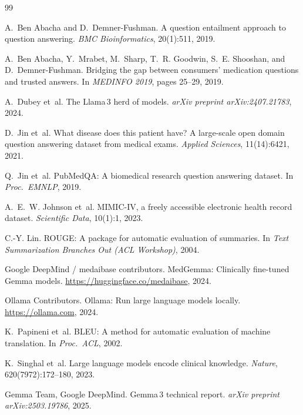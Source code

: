 \documentclass[11pt]{article}
\begin{document}
\begin{thebibliography}{99}

A.~Ben Abacha and D.~Demner-Fushman.
\newblock A question entailment approach to question answering.
\newblock \emph{BMC Bioinformatics}, 20(1):511, 2019.

A.~Ben Abacha, Y.~Mrabet, M.~Sharp, T.~R. Goodwin, S.~E. Shooshan, and
D.~Demner-Fushman.
\newblock Bridging the gap between consumers' medication questions and trusted
answers.
\newblock In \emph{MEDINFO 2019}, pages 25--29, 2019.

A.~Dubey et~al.
\newblock The Llama\,3 herd of models.
\newblock \emph{arXiv preprint arXiv:2407.21783}, 2024.

D.~Jin et~al.
\newblock What disease does this patient have? A large-scale open domain
question answering dataset from medical exams.
\newblock \emph{Applied Sciences}, 11(14):6421, 2021.

Q.~Jin et~al.
\newblock PubMedQA: A biomedical research question answering dataset.
\newblock In \emph{Proc.\ EMNLP}, 2019.

A.~E.~W. Johnson et~al.
\newblock MIMIC-IV, a freely accessible electronic health record dataset.
\newblock \emph{Scientific Data}, 10(1):1, 2023.

C.-Y. Lin.
\newblock ROUGE: A package for automatic evaluation of summaries.
\newblock In \emph{Text Summarization Branches Out (ACL Workshop)}, 2004.

{Google DeepMind / medaibase contributors}.
\newblock MedGemma: Clinically fine-tuned Gemma models.
\newblock \url{https://huggingface.co/medaibase}, 2024.

{Ollama Contributors}.
\newblock Ollama: Run large language models locally.
\newblock \url{https://ollama.com}, 2024.

K.~Papineni et~al.
\newblock BLEU: A method for automatic evaluation of machine translation.
\newblock In \emph{Proc.\ ACL}, 2002.

K.~Singhal et~al.
\newblock Large language models encode clinical knowledge.
\newblock \emph{Nature}, 620(7972):172--180, 2023.

{Gemma Team, Google DeepMind}.
\newblock Gemma\,3 technical report.
\newblock \emph{arXiv preprint arXiv:2503.19786}, 2025.


\end{thebibliography}
\end{document}
